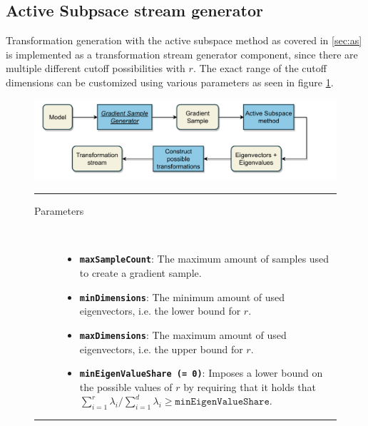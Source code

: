 \documentclass[
  a4paper,  %
  twoside,  %
  bibliography=totoc,
  headsepline,
  cleardoublepage=empty,
  parskip=half,
  draft=false
]{scrbook}
\newcommand{\delimit}{{\color{charcoal}\noindent\rule{\textwidth}{1pt}}}
\begin{document}
\newpage

\subsection{Active Subpsace stream generator}

Transformation generation with the active subspace method as covered in \cref{sec:as} is implemented as a transformation stream generator component, since there are multiple different cutoff possibilities with $r$.
The exact range of the cutoff dimensions can be customized using various parameters as seen in figure \cref{fig:astsg}.

\begin{mdframed}[style=style,frametitle={Transformation stream generator (active subspaces)}]
\begin{figure}[H]
\vspace{5px}
\includegraphics[width=\textwidth]{graphics/TransformationStreamGen_AS.pdf}

\delimit

\begin{description}
\item[Parameters] {~ \begin{itemize}[\indent{}]
\item \texttt{\textbf{maxSampleCount}}: The maximum amount of samples used to create a gradient sample.
\item \texttt{\textbf{minDimensions}}: The minimum amount of used eigenvectors, i.e. the lower bound for $r$.
\item \texttt{\textbf{maxDimensions}}: The maximum amount of used eigenvectors, i.e. the upper bound for $r$.
\item \texttt{\textbf{minEigenValueShare (= 0)}}: Imposes a lower bound on the possible values of $r$ by requiring that it holds that $\sum_{i=1}^r \lambda_i / \sum_{i=1}^d \lambda_i \geq \texttt{minEigenValueShare}$.
\end{itemize}}
\end{description}
\delimit
{}
\label{fig:astsg}
\end{figure}
\end{mdframed}
\end{document}
